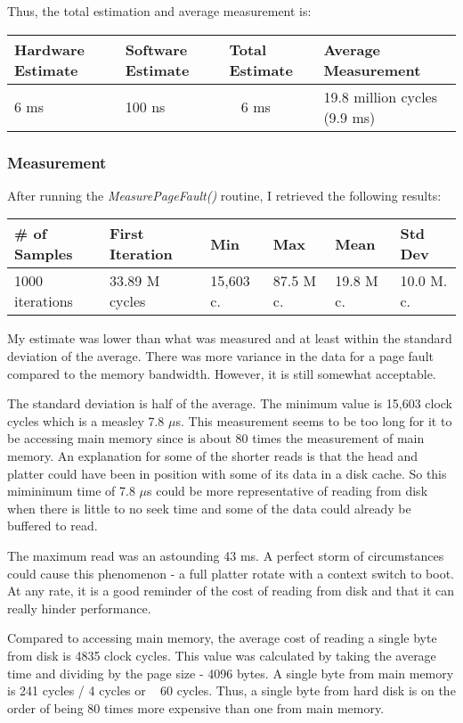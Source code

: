 \documentclass[paper=a4, fontsize=11pt]{scrartcl}
\numberwithin{equation}{section}        %
\numberwithin{figure}{section}          %
\numberwithin{table}{section}               %
\begin{document}
Thus, the total estimation and average measurement is:


\begin{center}
    \begin{tabular}{ | l | l | l | l |}
    \hline
    Hardware Estimate & Software Estimate & Total Estimate & Average Measurement \\      \hline
    6 ms & 100 ns & ~ 6 ms & 19.8 million cycles (9.9 ms) \\ 
    \hline
    \end{tabular}
\end{center}

\subsubsection{Measurement}

After running the \textit{MeasurePageFault()} routine, I retrieved the following results:

\begin{center}
    \begin{tabular}{ | l | l | l | l | l | l |}
    \hline
    \# of Samples & First Iteration & Min & Max & Mean & Std Dev \\
    \hline
    1000 iterations & 33.89 M cycles & 15,603 c. & 87.5 M c. & 19.8 M c. & 10.0 M. c. \\ 
    \hline
    \end{tabular}
\end{center}

My estimate was lower than what was measured and at least within the standard deviation of the average.  There was more variance in the data for a page fault compared to the memory bandwidth.  However, it is still somewhat acceptable.

The standard deviation is half of the average.  The minimum value is 15,603 clock cycles which is a measley 7.8 $\mu$s.  This measurement seems to be too long for it to be accessing main memory since is about 80 times the measurement of main memory.  An explanation for some of the shorter reads is that the head and platter could have been in position with some of its data in a disk cache.  So this miminimum time of 7.8 $\mu$s could be more representative of reading from disk when there is little to no seek time and some of the data could already be buffered to read.

The maximum read was an astounding 43 ms.  A perfect storm of circumstances could cause this phenomenon - a full platter rotate with a context switch to boot.  At any rate, it is a good reminder of the cost of reading from disk and that it can really hinder performance.

Compared to accessing main memory, the average cost of reading a single byte from disk is 4835 clock cycles.  This value was calculated by taking the average time and dividing by the page size - 4096 bytes.  A single byte from main memory is 241 cycles / 4 cycles or ~ 60 cycles.  Thus, a single byte from hard disk is on the order of being 80 times more expensive than one from main memory.  






\end{document}
